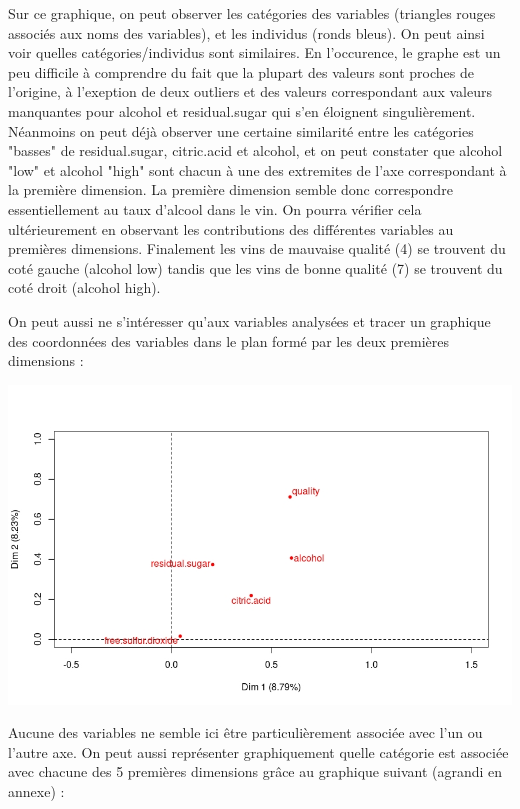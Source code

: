 \documentclass[11pt,a4paper]{article}
\begin{document}
Sur ce graphique, on peut observer les catégories des variables (triangles rouges associés aux noms des variables), et les individus (ronds bleus). On peut ainsi voir quelles catégories/individus sont similaires. En l'occurence, le graphe est un peu difficile à comprendre du fait que la plupart des valeurs sont proches de l'origine, à l'exeption de deux outliers et des valeurs correspondant aux valeurs manquantes pour alcohol et residual.sugar qui s'en éloignent singulièrement. Néanmoins on peut déjà observer une certaine similarité entre les catégories "basses" de residual.sugar, citric.acid et alcohol, et on peut constater que alcohol "low" et alcohol "high" sont chacun à une des extremites de l'axe correspondant à la première dimension. La première dimension semble donc correspondre essentiellement au taux d'alcool dans le vin. On pourra vérifier cela ultérieurement en observant les contributions des différentes variables au premières dimensions. Finalement les vins de mauvaise qualité (4) se trouvent du coté gauche (alcohol low) tandis que les vins de bonne qualité (7) se trouvent du coté droit (alcohol high). \bigskip

On peut aussi ne s'intéresser qu'aux variables analysées et tracer un graphique des coordonnées des variables dans le plan formé par les deux premières dimensions :
\begin{center}
\includegraphics[scale=0.6]{"plot-var-mca"}
\end{center}

Aucune des variables ne semble ici être particulièrement associée avec l'un ou l'autre axe. On peut aussi représenter graphiquement quelle catégorie est associée avec chacune des 5 premières dimensions grâce au graphique suivant  (agrandi en annexe) : 
\end{document}
